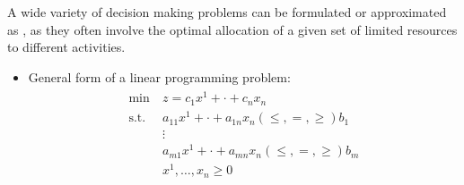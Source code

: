 \documentclass[english]{article}
\begin{document}
A wide variety of decision making problems can be formulated or approximated as \LP, as they often involve the optimal allocation of a given set of limited resources to different activities.

\begin{itemize}
  \item General form of a linear programming problem:
        \begin{gather}
          \begin{aligned}
            \min \         & z = c_1 x^1 + \cdot + c_n x_n                                    \\
            \text{s.t.} \  & a_{11} x^1 + \cdot + a_{1n} x_n \left( \leq, =, \geq \right) b_1 \\
                           & \vdots                                                           \\
                           & a_{m1} x^1 + \cdot + a_{mn} x_n \left( \leq, =, \geq \right) b_m \\
                           & x^1, \ldots, x_n \geq 0
          \end{aligned}
        \end{gather}


\end{itemize}
\end{document}
